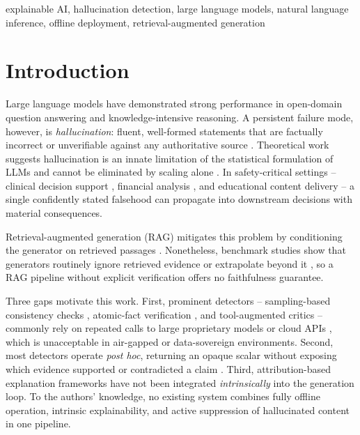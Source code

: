 \documentclass[conference]{IEEEtran}
\begin{document}
\begin{IEEEkeywords}
explainable AI, hallucination detection, large language models, natural language inference, offline deployment, retrieval-augmented generation
\end{IEEEkeywords}

\section{Introduction}
Large language models have demonstrated strong performance in open-domain question answering and knowledge-intensive reasoning. A persistent failure mode, however, is \emph{hallucination}: fluent, well-formed statements that are factually incorrect or unverifiable against any authoritative source \cite{ji2023survey,huang2025survey,lin2022truthfulqa}. Theoretical work suggests hallucination is an innate limitation of the statistical formulation of LLMs and cannot be eliminated by scaling alone \cite{xu2024inevitable}. In safety-critical settings -- clinical decision support \cite{ibrahim2024clinical,pal2023medical}, financial analysis \cite{islam2023financebench}, and educational content delivery \cite{zheng2025educational,chen2024tutoring} -- a single confidently stated falsehood can propagate into downstream decisions with material consequences.

Retrieval-augmented generation (RAG) mitigates this problem by conditioning the generator on retrieved passages \cite{lewis2020rag,guu2020realm,borgeaud2022retro,izacard2022atlas}. Nonetheless, benchmark studies show that generators routinely ignore retrieved evidence or extrapolate beyond it \cite{chen2024benchmarking,mallen2023trust,niu2024ragtruth}, so a RAG pipeline without explicit verification offers no faithfulness guarantee.

Three gaps motivate this work. First, prominent detectors -- sampling-based consistency checks \cite{manakul2023selfcheckgpt,farquhar2024semantic}, atomic-fact verification \cite{min2023factscore,wei2024longform}, and tool-augmented critics \cite{pan2023factool,gou2024critic} -- commonly rely on repeated calls to large proprietary models or cloud APIs \cite{es2024ragas,liu2023geval}, which is unacceptable in air-gapped or data-sovereign environments. Second, most detectors operate \emph{post hoc}, returning an opaque scalar without exposing which evidence supported or contradicted a claim \cite{minaee2024xai,rahman2026survey}. Third, attribution-based explanation frameworks \cite{zhang2024feel,agrawal2024attributed} have not been integrated \emph{intrinsically} into the generation loop. To the authors' knowledge, no existing system combines fully offline operation, intrinsic explainability, and active suppression of hallucinated content in one pipeline.
\end{document}
